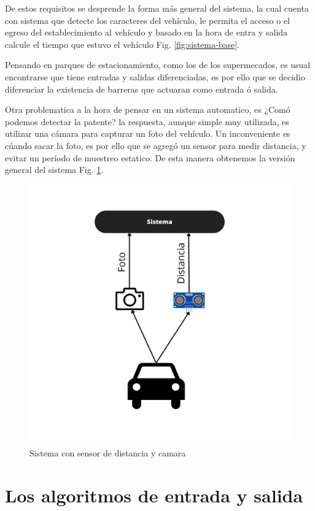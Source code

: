 De estos requisitos se desprende la forma más general del sistema, la cual cuenta con sistema que detecte los caracteres del vehículo, le permita el acceso o el egreso del establecimiento al vehículo y basado en la hora de entra y salida calcule el tiempo que estuvo el vehículo Fig. \ref{fig:sistema-base}.


Pensando en parques de estacionamiento, como los de los supermecados, es usual encontrarse que tiene entradas y salidas diferenciadas, es por ello que se decidio diferenciar la existencia de barreras que actuaran como entrada ó salida.

Otra problematica a la hora de pensar en un sistema automatico, es ¿Comó podemos detectar la patente? la respuesta, aunque simple muy utilizada, es utilizar una cámara para capturar un foto del vehículo. Un inconveniente es cúando sacar la foto, es por ello que se agregó un sensor para medir distancia, y evitar un período de muestreo estatico. De esta manera obtenemos la versión general del sistema Fig. \ref{fig:sistema-completa}.

\begin{figure}
    \centering
    \includegraphics[width=.8\textwidth]{imgs/sistema-con-sensor.png}
    \caption{Sistema con sensor de distancia y camara}
    \label{fig:sistema-completa}
\end{figure}

\section{Los algoritmos de entrada y salida}

